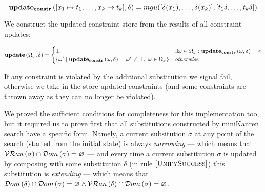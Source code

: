 \[ \mathbf{update_{constr}}\,([x_1 \mapsto t_1, \dots, x_k \mapsto t_k], \delta) = mgu([\delta(x_1), \dots, \delta(x_k)],[t_1 \delta, \dots, t_k \delta]) \]

We construct the updated constraint store from the results of all constraint updates:

\[
\mathbf{update}\,(\Omega_\sigma, \delta) =
\begin{cases}
  \bot                                                 & \exists \omega \in \Omega_\sigma: \mathbf{update_{constr}}\,(\omega, \delta) = \epsilon \\
  \{ \omega' \mid \mathbf{update_{constr}}\,(\omega, \delta) = \omega' \neq \bot, \; \omega \in \Omega_\sigma \}   & \textit{otherwise}
\end{cases}
\]

If any constraint is violated by the additional substitution we signal fail, otherwise we take in the store updated constraints
(and some constraints are thrown away as they can no longer be violated).

We proved the sufficient conditions for completeness for this implementation too, but it required us to prove first that all substitutions constructed by miniKanren search have a specific form. Namely, a current subsitution $\sigma$ at any point of the search (started from the initial state) is always \emph{narrowing} --- which means that $\mathcal{VR}an\,({\sigma}) \cap \mathcal{D}om\,({\sigma}) = \varnothing$ --- and every time a current substitution $\sigma$ is updated by composing with some substitution $\delta$ (in rule $\mbox{[\textsc{UnifySuccess}]}$) this substitution is \emph{extending} --- which means that $\mathcal{D}om\,({\delta}) \cap \mathcal{D}om\,({\sigma}) = \varnothing \land \mathcal{VR}an\,({\delta}) \cap \mathcal{D}om\,({\sigma}) = \varnothing$.
